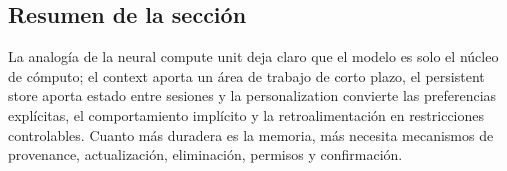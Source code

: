 \subsection{Resumen de la sección}

La analogía de la neural compute unit deja claro que el modelo es solo el núcleo de cómputo; el context aporta un área de trabajo de corto plazo, el persistent store aporta estado entre sesiones y la personalization convierte las preferencias explícitas, el comportamiento implícito y la retroalimentación en restricciones controlables. Cuanto más duradera es la memoria, más necesita mecanismos de provenance, actualización, eliminación, permisos y confirmación.
